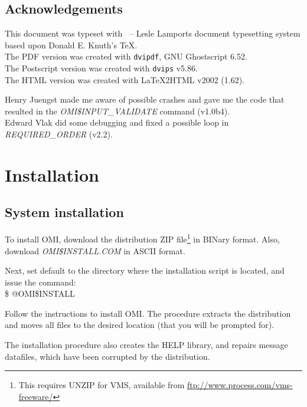 \documentclass[a4paper]{book}
\newcommand{\vs}{\vspace{3mm}}
\renewcommand{\indent}{\hspace*{5mm}}
\begin{document}
\section*{Acknowledgements}

This document was typeset with \LaTeXe\ -- Lesle Lamports document typesetting system
based upon Donald E. Knuth's \TeX.\\
The PDF version was created with \texttt{dvipdf}, GNU Ghostscript 6.52.\\
The Postscript version was created with \texttt{dvips} v5.86. \\
The HTML version was created with LaTeX2HTML v2002 (1.62).

\vs

Henry Juengst made me aware of possible crashes and gave me the code that
resulted in the \textsl{OMI\$INPUT\_VALIDATE} command (v1.0b4). \\
Edward Vlak did some debugging and fixed a possible loop in \textsl{REQUIRED\_ORDER} (v2.2).

\chapter{Installation}
\label{sec:installationrmed}

\section{System installation}
\label{subsec:system}

To install OMI, download the distribution ZIP file\footnote{ This requires UNZIP for VMS, available from
\url{ftp://www.process.com/vms-freeware/}} in BINary format.
Also, download \textsl{OMI{\$}INSTALL.COM} in ASCII format.
 
Next, set default to the directory where the installation
script is located, and issue the command: \\
\indent \textsf{{\$} @OMI{\$}INSTALL}
 

\vs

Follow the instructions to install OMI.
The procedure extracts the distribution and moves all
files to the desired location (that you will be prompted for).
 
The installation procedure also creates the HELP library,
and repairs message datafiles, which have been corrupted
by the distribution.
\end{document}
